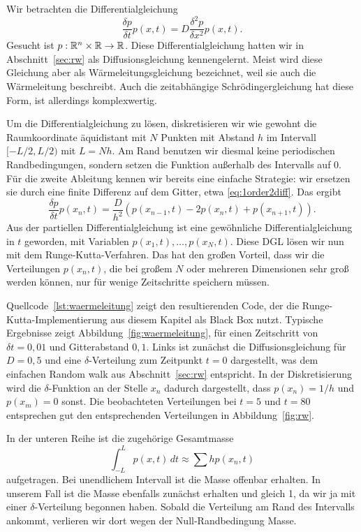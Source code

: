 Wir betrachten die Differentialgleichung
\begin{equation}
  \label{eq:diffdgl}
  \frac{\delta p}{\delta t} p(x, t) =
  D\frac{\delta^2 p}{\delta x^2} p(x, t).
\end{equation}
Gesucht ist $p:\mathbb{R}^n\times\mathbb{R}\to\mathbb{R}$. Diese Differentialgleichung
hatten wir in Abschnitt~\ref{sec:rw} als Diffusionsgleichung
kennengelernt. Meist wird diese Gleichung aber als
Wärmeleitungsgleichung bezeichnet, weil sie auch die Wärmeleitung
beschreibt. Auch die zeitabhängige Schrödingergleichung hat diese
Form, ist allerdings komplexwertig.

Um die Differentialgleichung zu lösen, diskretisieren wir wie gewohnt
die Raumkoordinate äquidistant mit $N$ Punkten mit Abstand $h$ im
Intervall $[-L/2,L/2)$ mit $L=Nh$.  Am Rand benutzen wir diesmal keine
periodischen Randbedingungen, sondern setzen die Funktion außerhalb
des Intervalls auf 0. Für die zweite Ableitung kennen wir bereits eine
einfache Strategie: wir ersetzen sie durch eine finite Differenz auf
dem Gitter, etwa \eqref{eq:1order2diff}. Das ergibt
\begin{equation}
  \frac{\delta p}{\delta t} p(x_n, t) =
  \frac{D}{h^2} \left(p(x_{n-1}, t) - 2 p(x_n, t) + p(x_{n+1}, t)\right).
\end{equation}
Aus der partiellen Differentialgleichung ist eine gewöhnliche
Differentialgleichung in $t$ geworden, mit Variablen
$p(x_1,t),\ldots,p(x_N, t)$. Diese DGL lösen wir nun mit dem
Runge-Kutta-Verfahren. Das hat den großen Vorteil, dass wir die
Verteilungen $p(x_n, t)$, die bei großem $N$ oder mehreren Dimensionen
sehr groß werden können, nur für wenige Zeitschritte speichern müssen.

Quellcode~\ref{lst:waermeleitung} zeigt den resultierenden Code, der
die Runge-Kutta-Implementierung aus diesem Kapitel als Black Box
nutzt. Typische Ergebnisse zeigt Abbildung~\ref{fig:waermeleitung},
für einen Zeitschritt von $\delta t=0,01$ und Gitterabstand
$0,1$. Links ist zunächst die Diffusionsgleichung für $D=0,5$ und eine
$\delta$-Verteilung zum Zeitpunkt $t=0$ dargestellt, was dem einfachen
Random walk aus Abschnitt~\ref{sec:rw} entspricht. In der
Diskretisierung wird die $\delta$-Funktion an der Stelle $x_n$ dadurch
dargestellt, dass $p(x_n)=1/h$ und $p(x_m)=0$ sonst. Die beobachteten
Verteilungen bei $t=5$ und $t=80$ entsprechen gut den entsprechenden
Verteilungen in Abbildung~\ref{fig:rw}.

In der unteren Reihe ist die zugehörige Gesamtmasse
\begin{equation}
  \int_{-L}^L p(x, t)\, dt \approx \sum h p(x_n, t)
\end{equation}
aufgetragen. Bei unendlichem Intervall ist die Masse offenbar
erhalten. In unserem Fall ist die Masse ebenfalls zunächst erhalten
und gleich 1, da wir ja mit einer $\delta$-Verteilung begonnen
haben. Sobald die Verteilung am Rand des Intervalls ankommt, verlieren
wir dort wegen der Null-Randbedingung Masse.

